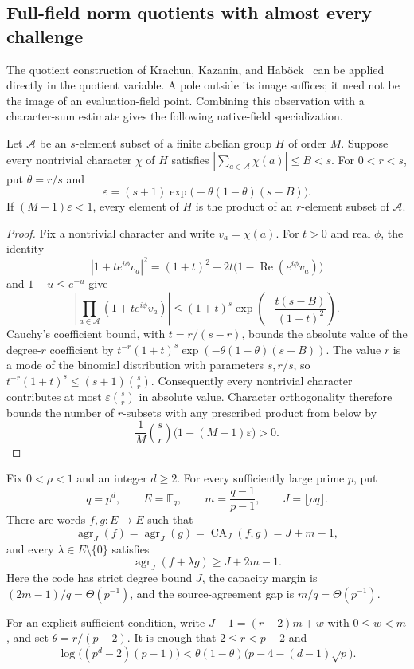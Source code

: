 \subsection{Full-field norm quotients with almost every challenge}
\label{subsec:native-norm-quotients}

The quotient construction of Krachun, Kazanin, and Hab\"ock~\cite[Appendix~A]{kkh} can be applied
directly in the quotient variable.  A pole outside its image suffices; it need
not be the image of an evaluation-field point.  Combining this observation
with a character-sum estimate gives the following native-field specialization.

\begin{lemma}\label{lem:fixed-cardinality-character-products}
Let $\mathcal A$ be an $s$-element subset of a finite abelian group
$H$ of order $M$.  Suppose every nontrivial character $\chi$ of $H$
satisfies $|\sum_{a\in\mathcal A}\chi(a)|\le B<s$.
For $0<r<s$, put $\theta=r/s$ and
\[
 \varepsilon=(s+1)\exp\bigl(-\theta(1-\theta)(s-B)\bigr).
\]
If $(M-1)\varepsilon<1$, every element of $H$ is the product of
an $r$-element subset of $\mathcal A$.
\end{lemma}
\begin{proof}
Fix a nontrivial character and write $v_a=\chi(a)$.  For $t>0$ and
real $\phi$, the identity
\[
 |1+te^{i\phi}v_a|^2
 =(1+t)^2-2t\bigl(1-\operatorname{Re}(e^{i\phi}v_a)\bigr)
\]
and $1-u\le e^{-u}$ give
\[
 \left|\prod_{a\in\mathcal A}(1+te^{i\phi}v_a)\right|
 \le (1+t)^s\exp\left(-\frac{t(s-B)}{(1+t)^2}\right).
\]
Cauchy's coefficient bound, with $t=r/(s-r)$, bounds the absolute
value of the degree-$r$ coefficient by
$t^{-r}(1+t)^s\exp(-\theta(1-\theta)(s-B))$.
The value $r$ is a mode of the binomial distribution with parameters
$s,r/s$, so
$t^{-r}(1+t)^s\le(s+1)\binom sr$.
Consequently every nontrivial character contributes at most
$\varepsilon\binom sr$ in absolute value.  Character orthogonality
therefore bounds the number of $r$-subsets with any prescribed product
from below by
\[
 \frac1M\binom sr\bigl(1-(M-1)\varepsilon\bigr)>0.
\]
\end{proof}

\begin{theorem}\label{thm:native-norm-quotient}
Fix $0<\rho<1$ and an integer $d\ge2$.
For every sufficiently large prime $p$, put
\[
 q=p^d,\qquad E=\mathbb F_q,\qquad
 m=\frac{q-1}{p-1},\qquad J=\lfloor\rho q\rfloor.
\]
There are words $f,g:E\to E$ such that
\[
 \operatorname{agr}_J(f)=\operatorname{agr}_J(g)
 =\operatorname{CA}_J(f,g)=J+m-1,
\]
and every $\lambda\in E\setminus\{0\}$ satisfies
\[
 \operatorname{agr}_J(f+\lambda g)\ge J+2m-1.
\]
Here the code has strict degree bound $J$, the capacity margin is
$(2m-1)/q=\Theta(p^{-1})$, and the source-agreement gap is
$m/q=\Theta(p^{-1})$.

For an explicit sufficient condition, write
$J-1=(r-2)m+w$ with $0\le w<m$, and set $\theta=r/(p-2)$.
It is enough that $2\le r<p-2$ and
\[
 \log\bigl((p^d-2)(p-1)\bigr)
 <\theta(1-\theta)\bigl(p-4-(d-1)\sqrt p\bigr).
\]
\end{theorem}

